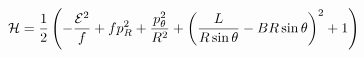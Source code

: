 \documentclass[preview]{standalone}
\begin{document}
\begin{align*}
\mathcal{H}=\frac{1}{2}\left(-{ \mathcal{E} ^2\over f}+fp_R^2+{p_\theta^2\over R^2}+\left( {L\over R\sin\theta}- B R\sin\theta\right)^2+1\right)
\end{align*}
\end{document}

